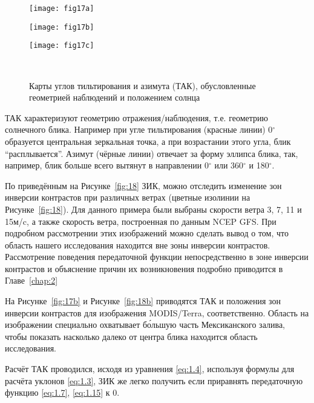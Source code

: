 \begin{figure}[H]
    	\centering
	\begin{minipage}{.33\textwidth}
	    \subcaptionbox{\label{fig:17a}}
		{\texttt{[image: fig17a]}}
	\end{minipage}
	\hfill
	\begin{minipage}{.31\textwidth}
	    \subcaptionbox{\label{fig:17b}}
		{\texttt{[image: fig17b]}}
	\end{minipage}
	\hfill
	\begin{minipage}{.31\textwidth}
	    \subcaptionbox{\label{fig:17c}}
		{\texttt{[image: fig17c]}}
	\end{minipage}
	\\
    \caption{Карты углов тильтирования и азимута (ТАК), обусловленные геометрией наблюдений и положением солнца}
    \label{fig:17}
\end{figure}


ТАК характеризуют геометрию отражения/наблюдения, т.е. геометрию солнечного блика. Например при угле тильтирования (красные линии) 0${}^\circ{}$ образуется центральная зеркальная точка, а при возрастании этого угла, блик ``расплывается''. Азимут (чёрные линии) отвечает за форму эллипса блика, так, например, блик больше всего вытянут в направлении 0${}^\circ{}$ или 360${}^\circ{}$ и 180${}^\circ{}$.

По приведённым на Рисунке~\ref{fig:18} ЗИК, можно отследить изменение зон инверсии контрастов при различных ветрах (цветные изолинии на Рисунке~\ref{fig:18}). Для данного примера были выбраны скорости ветра 3, 7, 11 и 15м/c, а также скорость ветра, построенная по данным NCEP GFS. При подробном рассмотрении этих изображений можно сделать вывод о том, что область нашего исследования находится вне зоны инверсии контрастов. Рассмотрение поведения передаточной функции непосредственно в зоне инверсии контрастов и объяснение причин их возникновения подробно приводится в Главе~\ref{chap:2}

На Рисунке~\ref{fig:17b} и Рисунке~\ref{fig:18b} приводятся ТАК и положения зон инверсии контрастов для изображения MODIS/Terra, соответственно. Область на изображении специально охватывает б\'{о}льшую часть Мексиканского залива, чтобы показать насколько далеко от центра блика находится область исследования.

Расчёт ТАК проводился, исходя из уравнения \eqref{eq:1.4}, используя формулы для расчёта уклонов \eqref{eq:1.3}, ЗИК же легко получить если приравнять передаточную функцию \eqref{eq:1.7}, \eqref{eq:1.15} к 0.

